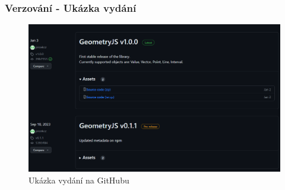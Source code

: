 \begin{frame}
    \frametitle{Verzování - Ukázka vydání}
    \begin{figure}
        \centering
        \includegraphics[height=0.7\textheight]{../resources/github-releases.png}
        \caption{Ukázka vydání na GitHubu}
    \end{figure}
\end{frame}